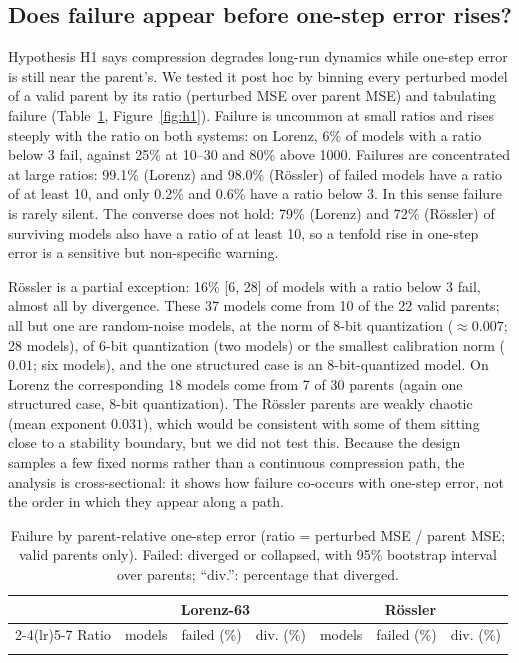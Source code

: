 \documentclass[11pt]{article}
\begin{document}
\subsection{Does failure appear before one-step error rises?}\label{sec:h1}
Hypothesis H1 says compression degrades long-run dynamics while one-step error is still near the parent's. We tested it post hoc by binning every perturbed model of a valid parent by its ratio (perturbed MSE over parent MSE) and tabulating failure (Table~\ref{tab:h1}, Figure~\ref{fig:h1}). Failure is uncommon at small ratios and rises steeply with the ratio on both systems: on Lorenz, 6\% of models with a ratio below 3 fail, against 25\% at 10--30 and 80\% above 1000. Failures are concentrated at large ratios: 99.1\% (Lorenz) and 98.0\% (R\"ossler) of failed models have a ratio of at least 10, and only 0.2\% and 0.6\% have a ratio below 3. In this sense failure is rarely silent. The converse does not hold: 79\% (Lorenz) and 72\% (R\"ossler) of surviving models also have a ratio of at least 10, so a tenfold rise in one-step error is a sensitive but non-specific warning.

R\"ossler is a partial exception: 16\% [6, 28] of models with a ratio below 3 fail, almost all by divergence. These 37 models come from 10 of the 22 valid parents; all but one are random-noise models, at the norm of 8-bit quantization ($\approx0.007$; 28 models), of 6-bit quantization (two models) or the smallest calibration norm ($0.01$; six models), and the one structured case is an 8-bit-quantized model. On Lorenz the corresponding 18 models come from 7 of 30 parents (again one structured case, 8-bit quantization). The R\"ossler parents are weakly chaotic (mean exponent $0.031$), which would be consistent with some of them sitting close to a stability boundary, but we did not test this. Because the design samples a few fixed norms rather than a continuous compression path, the analysis is cross-sectional: it shows how failure co-occurs with one-step error, not the order in which they appear along a path.

\begin{table}[t]
\centering\small
\caption{Failure by parent-relative one-step error (ratio = perturbed MSE / parent MSE; valid parents only). Failed: diverged or collapsed, with 95\% bootstrap interval over parents; ``div.'': percentage that diverged.}\label{tab:h1}
\begin{tabular}{lcccccc}
\toprule
 & \multicolumn{3}{c}{Lorenz-63} & \multicolumn{3}{c}{R\"ossler}\\
\cmidrule(lr){2-4}\cmidrule(lr){5-7}
Ratio & models & failed (\%) & div. (\%) & models & failed (\%) & div. (\%)\\
\midrule
\\
\bottomrule
\end{tabular}
\end{table}
\end{document}
